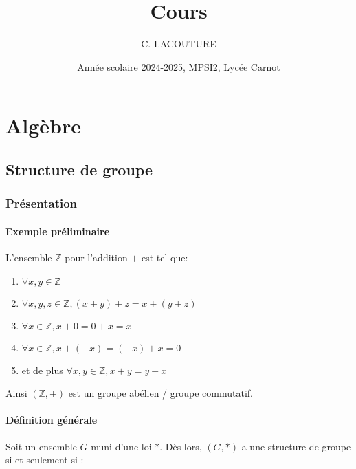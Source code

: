 \documentclass[12pt,a4paper,french]{book}
\title{Cours}
\author{C. LACOUTURE}
\date{Année scolaire 2024-2025, MPSI2, Lycée Carnot}
\begin{document}
\maketitle
\tableofcontents
	
\part{Algèbre}
\chapter{Structure de groupe}
	\begin{spacing}{1.0}
	\section{Présentation}
		\subsection{Exemple préliminaire}
		\begin{spacing}{1.0}
			L'ensemble \(\mathbb{Z}\) pour l'addition \(+\) est tel que:
			\begin{enumerate}[itemsep=2pt, topsep=1pt, partopsep=0pt, parsep=1pt]
				\item \(\forall x, y \in \mathbb{Z}\)
				\item \(\forall x, y, z \in \mathbb{Z}, (x + y) + z = x + (y + z)\)
				\item \(\forall x \in \mathbb{Z}, x + 0 = 0 + x = x\)
				\item \(\forall x \in \mathbb{Z}, x + (-x) = (-x) + x = 0\)
				\item et de plus \(\forall x, y \in \mathbb{Z}, x + y = y + x\)
			\end{enumerate}
			Ainsi \((\mathbb{Z}, +)\) est un groupe abélien / groupe commutatif.
		\end{spacing}
		\subsection{Définition générale}
		\begin{spacing}{1.0}
			Soit un ensemble \( G \) muni d'une loi \( * \). Dès lors, \( (G, *) \) a une structure de groupe si et seulement si :
			
\end{spacing}
\end{spacing}
\end{document}
